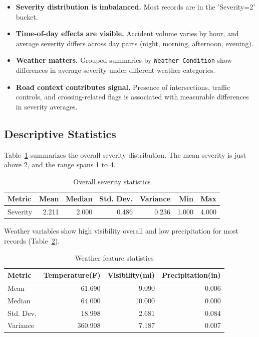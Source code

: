 \documentclass[11pt]{article}
\begin{document}
\begin{itemize}
    \item \textbf{Severity distribution is imbalanced.} Most records are in the 'Severity=2' bucket.
    \item \textbf{Time-of-day effects are visible.} Accident volume varies by hour, and average severity differs across day parts (night, morning, afternoon, evening).
    \item \textbf{Weather matters.} Grouped summaries by \texttt{Weather\_Condition} show differences in average severity under different weather categories.
    \item \textbf{Road context contributes signal.} Presence of intersections, traffic controls, and crossing-related flags is associated with measurable differences in severity averages.
\end{itemize}

\subsection{Descriptive Statistics}
Table~\ref{tab:severity_stats} summarizes the overall severity distribution. The mean severity is just above 2, and the range spans 1 to 4.

\begin{table}[H]
    \centering
    \caption{Overall severity statistics}
    \label{tab:severity_stats}
    \begin{tabular}{lrrrrrr}
        \toprule
        Metric   & Mean  & Median & Std. Dev. & Variance & Min   & Max   \\
        \midrule
        Severity & 2.211 & 2.000  & 0.486     & 0.236    & 1.000 & 4.000 \\
        \bottomrule
    \end{tabular}
\end{table}

Weather variables show high visibility overall and low precipitation for most records (Table~\ref{tab:weather_stats}).

\begin{table}[H]
    \centering
    \caption{Weather feature statistics}
    \label{tab:weather_stats}
    \begin{tabular}{lrrr}
        \toprule
        Metric    & Temperature(F) & Visibility(mi) & Precipitation(in) \\
        \midrule
        Mean      & 61.690         & 9.090          & 0.006             \\
        Median    & 64.000         & 10.000         & 0.000             \\
        Std. Dev. & 18.998         & 2.681          & 0.084             \\
        Variance  & 360.908        & 7.187          & 0.007             \\
        \bottomrule
    \end{tabular}
\end{table}
\end{document}
